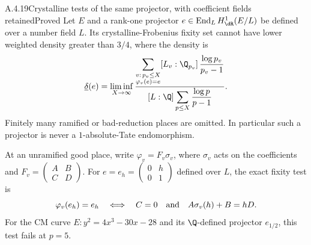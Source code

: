 \begin{result}{A.4.19}{Crystalline tests of the same projector, with coefficient fields retained}{Proved}
Let $E$ and a rank-one projector $e\in\operatorname{End}_L H^1_{\dR}(E/L)$ be defined over a number field $L$. Its crystalline-Frobenius fixity set cannot have lower weighted density greater than $3/4$, where the density is
\[
 \underline\delta(e)=\liminf_{X\to\infty}
 \frac{\displaystyle\sum_{\substack{v:\,p_v\le X\\\varphi_v(e)=e}}
 [L_v:\Q_{p_v}]\,\frac{\log p_v}{p_v-1}}
 {[L:\Q]\displaystyle\sum_{p\le X}\frac{\log p}{p-1}}.
\]
Finitely many ramified or bad-reduction places are omitted. In particular such a projector is never a $1$-absolute-Tate endomorphism.

At an unramified good place, write $\varphi_v=F_v\sigma_v$, where $\sigma_v$ acts on the coefficients and $F_v=\left(\begin{smallmatrix}A&B\\C&D\end{smallmatrix}\right)$. For $e=e_h=\left(\begin{smallmatrix}0&h\\0&1\end{smallmatrix}\right)$ defined over $L$, the exact fixity test is
\[
 \varphi_v(e_h)=e_h
 \quad\Longleftrightarrow\quad
 C=0\quad\hbox{and}\quad A\sigma_v(h)+B=hD.
\]
For the CM curve $E:y^2=4x^3-30x-28$ and its $\Q$-defined projector $e_{1/2}$, this test fails at $p=5$.
\end{result}
